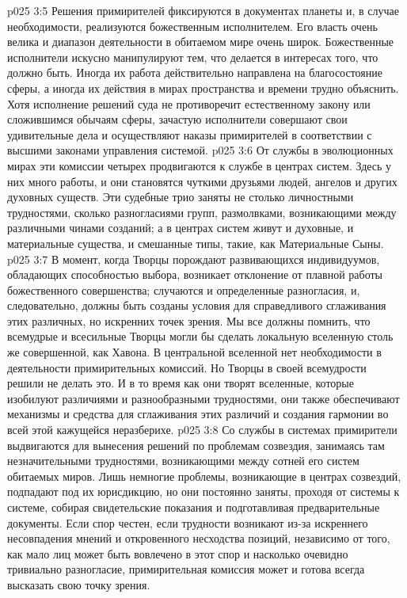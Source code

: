 \vs p025 3:5 Решения примирителей фиксируются в документах планеты и, в случае необходимости, реализуются божественным исполнителем. Его власть очень велика и диапазон деятельности в обитаемом мире очень широк. Божественные исполнители искусно манипулируют тем, что делается в интересах того, что должно быть. Иногда их работа действительно направлена на благосостояние сферы, а иногда их действия в мирах пространства и времени трудно объяснить. Хотя исполнение решений суда не противоречит естественному закону или сложившимся обычаям сферы, зачастую исполнители совершают свои удивительные дела и осуществляют наказы примирителей в соответствии с высшими законами управления системой.
\vs p025 3:6 \pc {}\bibnobreakspace {} От службы в эволюционных мирах эти комиссии четырех продвигаются к службе в центрах систем. Здесь у них много работы, и они становятся чуткими друзьями людей, ангелов и других духовных существ. Эти судебные трио заняты не столько личностными трудностями, сколько разногласиями групп, размолвками, возникающими между различными чинами созданий; а в центрах систем живут и духовные, и материальные существа, и смешанные типы, такие, как Материальные Сыны.
\vs p025 3:7 В момент, когда Творцы порождают развивающихся индивидуумов, обладающих способностью выбора, возникает отклонение от плавной работы божественного совершенства; случаются и определенные разногласия, и, следовательно, должны быть созданы условия для справедливого сглаживания этих различных, но искренних точек зрения. Мы все должны помнить, что всемудрые и всесильные Творцы могли бы сделать локальную вселенную столь же совершенной, как Хавона. В центральной вселенной нет необходимости в деятельности примирительных комиссий. Но Творцы в своей всемудрости решили не делать это. И в то время как они творят вселенные, которые изобилуют различиями и разнообразными трудностями, они также обеспечивают механизмы и средства для сглаживания этих различий и создания гармонии во всей этой кажущейся неразберихе.
\vs p025 3:8 \pc {}\bibnobreakspace {} Со службы в системах примирители выдвигаются для вынесения решений по проблемам созвездия, занимаясь там незначительными трудностями, возникающими между сотней его систем обитаемых миров. Лишь немногие проблемы, возникающие в центрах созвездий, подпадают под их юрисдикцию, но они постоянно заняты, проходя от системы к системе, собирая свидетельские показания и подготавливая предварительные документы. Если спор честен, если трудности возникают из\hyp{}за искреннего несовпадения мнений и откровенного несходства позиций, независимо от того, как мало лиц может быть вовлечено в этот спор и насколько очевидно тривиально разногласие, примирительная комиссия может и готова всегда высказать свою точку зрения.

